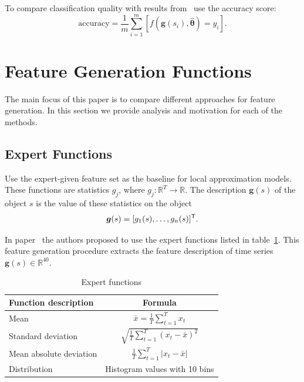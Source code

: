 To compare classification quality with results from~\cite{karasikov2016feature,ivkin2015ts} use the accuracy score:
\begin{equation}
\mathrm{accuracy} = \frac{1}{m} \sum_{i=1}^{m} \left[f\left(\bm{g}(s_i), \hat{\bm{\theta}} \right)= y_i\right].
\label{eq::accuracy}
\end{equation}

\section{Feature Generation Functions}

The main focus of this paper is to compare different approaches for feature generation. 
In this section we provide analysis and motivation for each of the methods.

\subsection{Expert Functions}

Use the expert-given feature set as the baseline for local approximation models.
These functions are statistics $g_j$, where $g_j: \mathbb{R}^T \rightarrow \mathbb{R}$.
The description $\bm{g}(s)$ of the object $s$ is the value of these statistics on the object 
\[
\bm{g}(s) = [g_1(s), \dots, g_n(s)]^{{\mbox{\scriptsize\sffamily\upshape\mdseries T}}}.
\]

In paper~\cite{kwapisz2011activity} the authors proposed to use the expert functions listed in table~\ref{tbl::expert_functions}.
This feature generation procedure extracts the feature description of time series $\bm{g}(s) \in \mathbb{R}^{40}$.

\begin{table}[h]
	\centering
	\caption{Expert functions}
	\begin{tabular}{|l|c|}
		\hline
		\textbf{Function description}    & \textbf{Formula} \\ \hline
		Mean                    & $\bar{x} = \frac{1}{T} \sum_{t=1}^{T} x_t$    \\ \hline
		Standard deviation      & $\sqrt{\frac{1}{T} \sum_{t=1}^{T} (x_t - \bar{x})^2}$    \\ \hline
		Mean absolute deviation & $\frac{1}{T} \sum_{t=1}^{T} |x_t - \bar{x}|$    \\ \hline
		Distribution            &  Histogram values with 10 bins    \\ \hline
	\end{tabular}
	\label{tbl::expert_functions}
\end{table}

